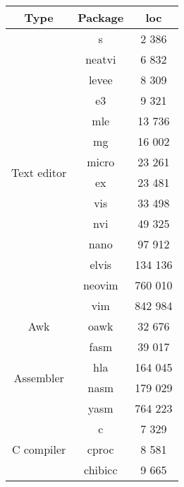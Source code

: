 \begin{table}[!ht]
    \centering
    \begin{tabular}{|c|c|c|}
        \hline
        Type & Package & \gls{loc} \\
        \hline
        \hline
        \multirow{14}{*}{Text editor}
        & s \cite{s} & 2 386 \\
        \cline{2-3}
        & neatvi \cite{neatvi} & 6 832 \\
        \cline{2-3}
        & levee \cite{levee} \footnotemark[4] & 8 309 \\
        \cline{2-3}
        & e3 \cite{e3-editor} & 9 321 \\ %
        \cline{2-3}
        & mle \cite{mle} & 13 736 \\
        \cline{2-3}
        & mg \cite{mg} & 16 002 \\
        \cline{2-3}
        & micro \cite{micro} & 23 261 \\ %
        \cline{2-3}
        & ex \cite{ex-vi} \footnotemark[5] & 23 481 \\
        \cline{2-3}
        & vis \cite{vis} & 33 498 \\ %
        \cline{2-3}
        & nvi \cite{nvi} \footnotemark[5] & 49 325 \\
        \cline{2-3}
        & nano \cite{nano} & 97 912 \\
        \cline{2-3}
        & elvis \cite{elvis} & 134 136 \\
        \cline{2-3}
        & neovim \cite{neovim} & 760 010 \\
        \cline{2-3}
        & vim \cite{vim} & 842 984 \\
        \hline
        \hline
        Awk & oawk \cite{oawk} & 32 676 \\
        \hline
        \hline
        \multirow{4}{*}{Assembler}
        & fasm \cite{fasm} & 39 017 \\ %
        \cline{2-3}
        & hla \cite{hla} & 164 045 \\
        \cline{2-3}
        & nasm \cite{nasm} & 179 029 \\
        \cline{2-3}
        & yasm \cite{yasm} & 764 223 \\ %
        \hline
        \hline
        \multirow{10}{*}{C compiler}
        & c \cite{c} & 7 329 \\
        \cline{2-3}
        & cproc \cite{cproc} & 8 581 \\
        \cline{2-3}
        & chibicc \cite{chibicc} & 9 665 \\

\end{tabular}
\end{table}
